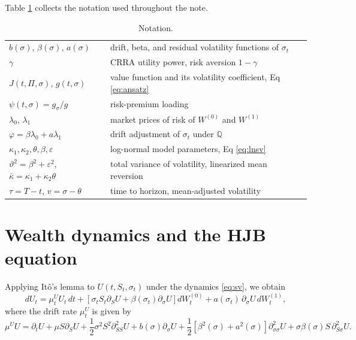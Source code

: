\documentclass[11pt]{article}
\theoremstyle{remark}
\newcommand{\QQ}{\mathbb{Q}}
\begin{document}
Table \ref{tab:notation} collects the notation used throughout the note.
\begin{table}[h]
\centering
\begin{tabular}{ll}
\hline
$b(\sigma)$, $\beta(\sigma)$, $a(\sigma)$ & drift, beta, and residual volatility functions of $\sigma_{t}$ \\
$\gamma$ & CRRA utility power, risk aversion $1-\gamma$ \\
$J(t,\Pi,\sigma)$, $g(t,\sigma)$ & value function and its volatility coefficient, Eq \eqref{eq:ansatz} \\
$\psi(t,\sigma)=g_{\sigma}/g$ & risk-premium loading \\
$\lambda_{0}$, $\lambda_{1}$ & market prices of risk of $W^{(0)}$ and $W^{(1)}$ \\
$\varphi = \beta\lambda_{0} + a\lambda_{1}$ & drift adjustment of $\sigma_{t}$ under $\QQ$ \\
$\kappa_{1},\kappa_{2},\theta,\beta,\varepsilon$ & log-normal model parameters, Eq \eqref{eq:lnsv} \\
$\vartheta^{2}=\beta^{2}+\varepsilon^{2}$, $\bar\kappa = \kappa_{1}+\kappa_{2}\theta$ & total variance of volatility, linearized mean reversion \\
$\tau=T-t$, $v = \sigma-\theta$ & time to horizon, mean-adjusted volatility \\
\hline
\end{tabular}
\caption{Notation.}
\label{tab:notation}
\end{table}

\section{Wealth dynamics and the HJB equation}\label{sec:hjb}

Applying It\^{o}'s lemma to $U(t,S_{t},\sigma_{t})$ under the dynamics \eqref{eq:sv}, we obtain
\begin{equation}\label{eq:dU}
dU_{t} = \mu^{U}_{t} U_{t}\, dt+ \left[\sigma_{t}S_{t}\partial_{S}U + \beta(\sigma_{t})\partial_{\sigma}U\right] dW^{(0)}_{t}+ a(\sigma_{t})\, \partial_{\sigma}U\, dW^{(1)}_{t},
\end{equation}
where the drift rate $\mu^{U}_{t}$ is given by
\begin{equation}\label{eq:muU}
\mu^{U} U = \partial_{t} U + \mu S \partial_{S} U + \frac{1}{2}\sigma^{2} S^{2} \partial^{2}_{SS} U  +  b(\sigma) \partial_{\sigma} U + \frac{1}{2}\left[ \beta^{2}(\sigma) + a^{2}(\sigma) \right] \partial^{2}_{\sigma\sigma} U + \sigma\beta(\sigma)S\,\partial^{2}_{S\sigma} U.
\end{equation}
\end{document}
